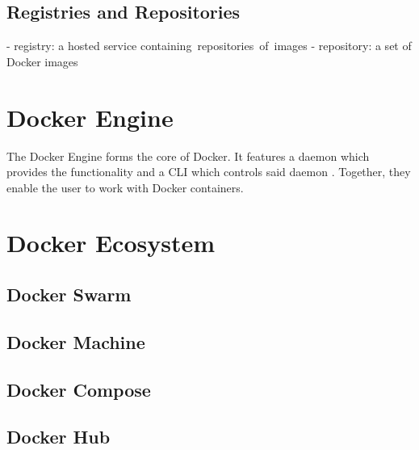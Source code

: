 
  \subsection{Registries and Repositories} %
  \label{sub:registries_and_repositories}
    - registry: a hosted service containing repositories of images
    - repository:  a set of Docker images
    \cite{Docker????Docker}



\section{Docker Engine} %
\label{sec:docker_engine}

 The Docker Engine forms the core of Docker. It features a daemon which provides the functionality and a \ac{CLI} which controls said daemon \cite{Docker????DockerCom}. Together, they enable the user to work with Docker containers.


\section{Docker Ecosystem} %
\label{sec:docker_ecosystem}

  \subsection{Docker Swarm} %
  \label{sub:docker_swarm}


  \subsection{Docker Machine} %
  \label{sub:docker_machine}


  \subsection{Docker Compose} %
  \label{sub:docker_compose}


  \subsection{Docker Hub} %
  \label{sub:docker_hub}


